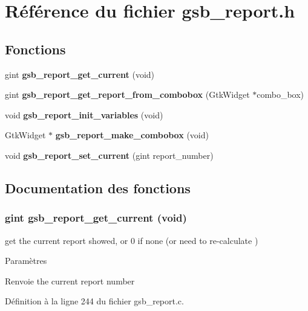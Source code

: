 \section{Référence du fichier gsb\_\-report.h}
\label{gsb__report_8h}
\subsection*{Fonctions}
\begin{DoxyCompactItemize}
\item 
gint {\bf gsb\_\-report\_\-get\_\-current} (void)
\item 
gint {\bf gsb\_\-report\_\-get\_\-report\_\-from\_\-combobox} (GtkWidget $\ast$combo\_\-box)
\item 
void {\bf gsb\_\-report\_\-init\_\-variables} (void)
\item 
GtkWidget $\ast$ {\bf gsb\_\-report\_\-make\_\-combobox} (void)
\item 
void {\bf gsb\_\-report\_\-set\_\-current} (gint report\_\-number)
\end{DoxyCompactItemize}


\subsection{Documentation des fonctions}
\subsubsection[{gsb\_\-report\_\-get\_\-current}]{\setlength{\rightskip}{0pt plus 5cm}gint gsb\_\-report\_\-get\_\-current (void)}\label{gsb__report_8h_aec0b1b2d20d93937ab296c312cba6016}
get the current report showed, or 0 if none (or need to re-\/calculate )


\begin{DoxyParams}{Paramètres}
\item[{\em }]\end{DoxyParams}
\begin{DoxyReturn}{Renvoie}
the current report number 
\end{DoxyReturn}


Définition à la ligne 244 du fichier gsb\_\-report.c.

